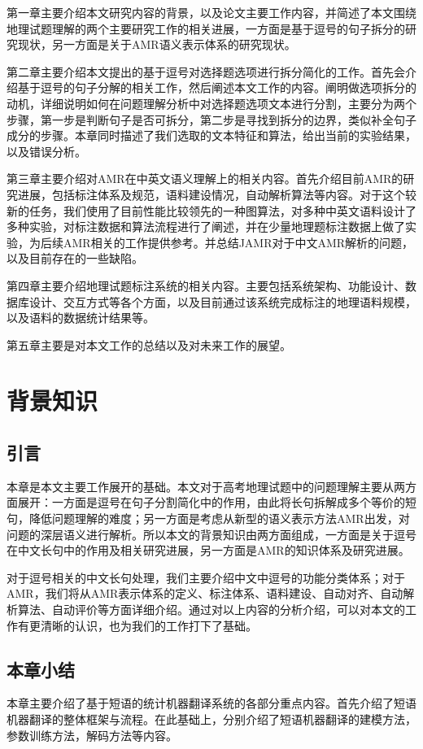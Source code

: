\documentclass[master, winfont]{njuthesis}
\begin{document}
第一章主要介绍本文研究内容的背景，以及论文主要工作内容，并简述了本文围绕地理试题理解的两个主要研究工作的相关进展，一方面是基于逗号的句子拆分的研究现状，另一方面是关于AMR语义表示体系的研究现状。

第二章主要介绍本文提出的基于逗号对选择题选项进行拆分简化的工作。首先会介绍基于逗号的句子分解的相关工作，然后阐述本文工作的内容。阐明做选项拆分的动机，详细说明如何在问题理解分析中对选择题选项文本进行分割，主要分为两个步骤，第一步是判断句子是否可拆分，第二步是寻找到拆分的边界，类似补全句子成分的步骤。本章同时描述了我们选取的文本特征和算法，给出当前的实验结果，以及错误分析。

第三章主要介绍对AMR在中英文语义理解上的相关内容。首先介绍目前AMR的研究进展，包括标注体系及规范，语料建设情况，自动解析算法等内容。对于这个较新的任务，我们使用了目前性能比较领先的一种图算法，对多种中英文语料设计了多种实验，对标注数据和算法流程进行了阐述，并在少量地理题标注数据上做了实验，为后续AMR相关的工作提供参考。并总结JAMR对于中文AMR解析的问题，以及目前存在的一些缺陷。

第四章主要介绍地理试题标注系统的相关内容。主要包括系统架构、功能设计、数据库设计、交互方式等各个方面，以及目前通过该系统完成标注的地理语料规模，以及语料的数据统计结果等。

第五章主要是对本文工作的总结以及对未来工作的展望。

\chapter{背景知识}
\section{引言}


本章是本文主要工作展开的基础。本文对于高考地理试题中的问题理解主要从两方面展开：一方面是逗号在句子分割简化中的作用，由此将长句拆解成多个等价的短句，降低问题理解的难度；另一方面是考虑从新型的语义表示方法AMR出发，对问题的深层语义进行解析。所以本文的背景知识由两方面组成，一方面是关于逗号在中文长句中的作用及相关研究进展，另一方面是AMR的知识体系及研究进展。

对于逗号相关的中文长句处理，我们主要介绍中文中逗号的功能分类体系；对于AMR，我们将从AMR表示体系的定义、标注体系、语料建设、自动对齐、自动解析算法、自动评价等方面详细介绍。通过对以上内容的分析介绍，可以对本文的工作有更清晰的认识，也为我们的工作打下了基础。


\section{本章小结}
本章主要介绍了基于短语的统计机器翻译系统的各部分重点内容。首先介绍了短语机器翻译的整体框架与流程。在此基础上，分别介绍了短语机器翻译的建模方法，参数训练方法，解码方法等内容。
\end{document}
